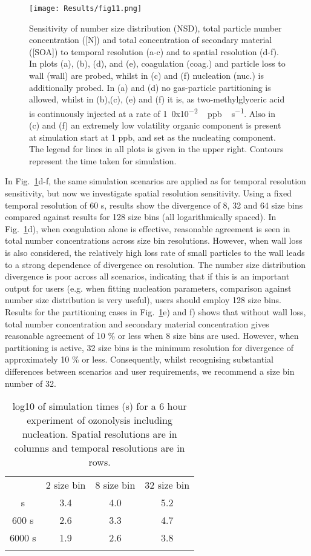\documentclass[gmd, manuscript]{copernicus}
\begin{document}
\begin{figure}[t]
\texttt{[image: Results/fig11.png]}
\caption{Sensitivity of number size distribution (NSD), total particle number concentration ([N]) and total concentration of secondary material ([SOA]) to temporal resolution (a-c) and to spatial resolution (d-f).  In plots (a), (b), (d), and (e), coagulation (coag.) and particle loss to wall (wall) are probed, whilst in (c) and (f) nucleation (nuc.) is additionally probed.  In (a) and (d) no gas-particle partitioning is allowed, whilst in (b),(c), (e) and (f) it is, as two-methylglyceric acid is continuously injected at a rate of \unit{1.0x10^{-2}\, ppb \, s^{-1}}.  Also in (c) and (f) an extremely low volatility organic component is present at simulation start at 1 \unit{ppb}, and set as the nucleating component.  The legend for lines in all plots is given in the upper right.  Contours represent the time taken for simulation.}
\label{fig:tr_tests_plot}
\end{figure}

In Fig.~\ref{fig:tr_tests_plot}d-f, the same simulation scenarios are applied as for temporal resolution sensitivity, but now we investigate spatial resolution sensitivity.  Using a fixed temporal resolution of 60 s, results show the divergence of 8, 32 and 64 size bins compared against results for 128 size bins (all logarithmically spaced).  In Fig.~\ref{fig:tr_tests_plot}d), when coagulation alone is effective, reasonable agreement is seen in total number concentrations across size bin resolutions.  However, when wall loss is also considered, the relatively high loss rate of small particles to the wall leads to a strong dependence of divergence on resolution.  The number size distribution divergence is poor across all scenarios, indicating that if this is an important output for users (e.g. when fitting nucleation parameters, comparison against number size distribution is very useful), users should employ 128 size bins.  Results for the partitioning cases in Fig.~\ref{fig:tr_tests_plot}e) and f) shows that without wall loss, total number concentration and secondary material concentration gives reasonable agreement of 10 \% or less when 8 size bins are used.  However, when partitioning is active, 32 size bins is the minimum resolution for divergence of approximately 10 \% or less.  Consequently, whilst recognising substantial differences between scenarios and user requirements, we recommend a size bin number of 32.

\begin{table*}[t]
\caption{log10 of simulation times (s) for a 6 hour experiment of  ozonolysis including nucleation.  Spatial resolutions are in columns and temporal resolutions are in rows.}
\begin{tabular}{c c c c}
\tophline
  & 2 size bin & 8 size bin & 32 size bin \\
\middlehline
60 s & 3.4 & 4.0 & 5.2 \\
600 s & 2.6 & 3.3 & 4.7 \\
6000 s & 1.9 & 2.6 & 3.8 \\
\bottomhline
\end{tabular}
\belowtable{} %
\label{tab:sim_times}
\end{table*}
\end{document}
